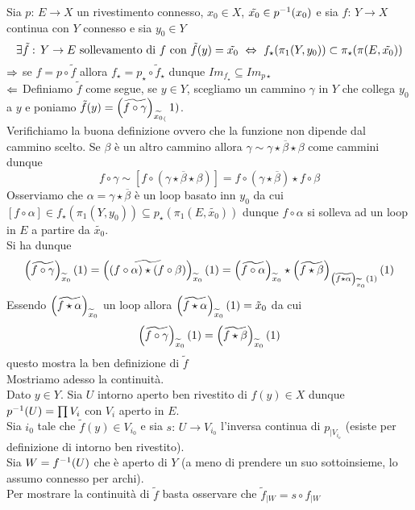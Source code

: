 \begin{thm}\bianco 
Sia $p:\, E \to X$ un rivestimento connesso, $x_0\in X$, $\tilde{x_0}\in p^{-1}(x_0)$ e sia $f:\, Y \to X$ continua con $Y$ connesso e sia $y_0\in Y$
$$ \exists \tilde{f}:\, Y \to E \text{ sollevamento di } f \text{ con } \tilde{f}(y)=\tilde{x_0}\,\, \Leftrightarrow \, \, f_\star(\pi_1(Y,y_0))\subset \pi_\star(\pi(E,\tilde{x_0}))$$
\proof $\Rightarrow$ se $f=p\circ \tilde{f}$ allora $f_\star=p_\star \circ \tilde{f}_\star$ dunque $Im_{f_\star}\subseteq Im_{p\star}$\\
$\Leftarrow$ Definiamo $\tilde{f}$ come segue, se $y \in Y$, scegliamo un cammino $\gamma$ in $Y$ che collega $y_0$ a $y$ e poniamo $\tilde{f}(y)= \left(\widetilde{f\circ \gamma}\right)_{\widetilde{x_0}_{(}}1) $.\\
Verifichiamo la buona definizione ovvero che la funzione non dipende dal cammino scelto. Se $\beta$ \`e un altro cammino allora $\gamma\sim \gamma \star \overline{\beta}\star \beta$ come cammini dunque 
$$ f \circ \gamma \sim [ f \circ ( \gamma \star \overline{\beta}\star \beta ) ] = f \circ (\gamma \star \overline{\beta}) \star f\circ \beta $$
Osserviamo che $\alpha=\gamma \star \overline{\beta}$ \`e un loop basato inn $y_0$ da cui  $[f\circ  \alpha]\in f_\star (\pi_1(Y,y_0))\subseteq p_\star (\pi_1(E, \tilde{x_0}))$ dunque $f\circ \alpha$ si solleva ad un loop in $E$ a partire da $\tilde{x_0}$.\\
Si ha dunque 
$$\left(\widetilde{f\circ \gamma}\right)_{\widetilde{x}_{0}}(1)=\left(\widetilde{(f \circ \alpha)\star (f \circ \beta)}\right)_{\widetilde{x}_{0}} (1)= \left(\widetilde{f\circ \alpha}\right)_{\widetilde{x}_{0}}  \star \left(\widetilde{f\star \beta } \right)_{\left(\widetilde{f\star \alpha}\right)_{\widetilde{x}_{0}} (1)}(1)$$
Essendo  $\left(\widetilde{f\star \alpha}\right)_{\widetilde{x}_{0}} $ un loop allora $\left(\widetilde{f\star \alpha}\right)_{\widetilde{x}_{0}}(1)=\tilde{x}_0$ da cui
$$\left(\widetilde{f\circ \gamma}\right)_{\widetilde{x}_{0}}(1)=\left(\widetilde{f\star \beta }\right)_{\widetilde{x}_{0}} (1)$$
questo mostra la ben definizione di $\tilde{f}$\\
Mostriamo adesso la continuit\`a.\\
Dato $y \in Y$. Sia $U$ intorno aperto ben rivestito di $f(y)\in X$ dunque $p^{-1} (U) =\prod V_i$ con $V_i $ aperto in $E$.\\
Sia $i_0$ tale che $\tilde{f}(y) \in V_{i_0}$ e sia $s:\, U \to V_{i_0}$ l'inversa continua di $p_{\vert V_{i_o}}$ (esiste per definizione di intorno ben rivestito).\\
Sia $W=f^{-1}(U)$ che \`e aperto di $Y$ (a meno di prendere un suo sottoinsieme, lo assumo connesso per archi).\\
Per mostrare la continuit\`a di $\tilde{f}$ basta osservare che $\tilde{f}_{\vert W} = s \circ f_{\vert W} $\\ 

\end{thm}
